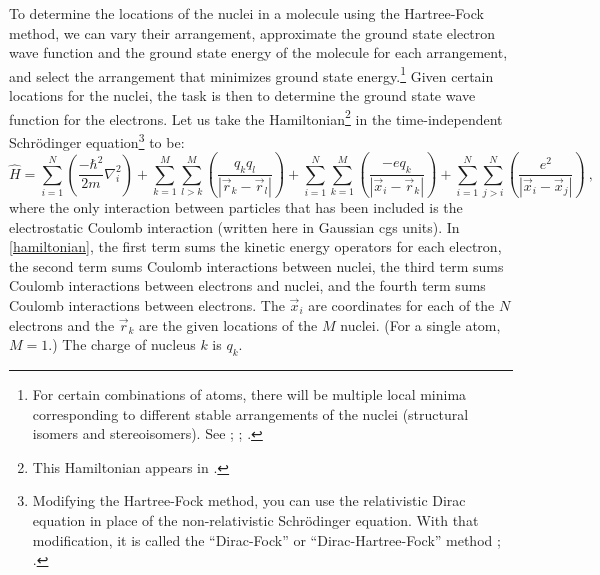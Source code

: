 \documentclass[onecolumn,secnumarabic,amsmath,amssymb,balancelastpage,nofootinbib]{article}
\begin{document}
To determine the locations of the nuclei in a molecule using the Hartree-Fock method, we can vary their arrangement, approximate the ground state electron wave function and the ground state energy of the molecule for each arrangement, and select the arrangement that minimizes ground state energy.\footnote{For certain combinations of atoms, there will be multiple local minima corresponding to different stable arrangements of the nuclei (structural isomers and stereoisomers).  See \cite{lowdin1989}; \cite[sec.\ 15.10]{levineQC}; \cite{franklinF}.}  Given certain locations for the nuclei, the task is then to determine the ground state wave function for the electrons.  Let us take the Hamiltonian\footnote{This Hamiltonian appears in \cite[pg.\ 345]{levineQC}.} in the time-independent Schr\"{o}dinger equation\footnote{Modifying the Hartree-Fock method, you can use the relativistic Dirac equation in place of the non-relativistic Schr\"{o}dinger equation.  With that modification, it is called the ``Dirac-Fock'' or ``Dirac-Hartree-Fock'' method \cite{desclaux2002}; \cite[pg.\ 581]{levineQC}.} to be:
\begin{equation}
\widehat{H}= \sum_{i=1}^{N}\left(\frac{-\hbar^2}{2 m} \nabla_i^2 \right)  + \sum_{k=1}^{M}\sum_{l>k}^{M} \left(\frac{q_k q_l}{|\vec{r}_k-\vec{r}_l|}\right) +  \sum_{i=1}^{N}\sum_{k=1}^{M}\left(\frac{-e q_k}{|\vec{x}_i-\vec{r}_k|}\right)  + \sum_{i=1}^{N}\sum_{j>i}^{N}\left(\frac{e^2}{|\vec{x}_i-\vec{x}_j|}\right)
\ ,
\label{hamiltonian}
\end{equation}
where the only interaction between particles that has been included is the electrostatic Coulomb interaction (written here in Gaussian cgs units).  In \eqref{hamiltonian}, the first term sums the kinetic energy operators for each electron, the second term sums Coulomb interactions between nuclei, the third term sums Coulomb interactions between electrons and nuclei, and the fourth term sums Coulomb interactions between electrons.  The $\vec{x}_i$ are coordinates for each of the $N$ electrons and the $\vec{r}_k$ are the given locations of the $M$ nuclei.  (For a single atom, $M=1$.)  The charge of nucleus $k$ is $q_k$.
\end{document}

